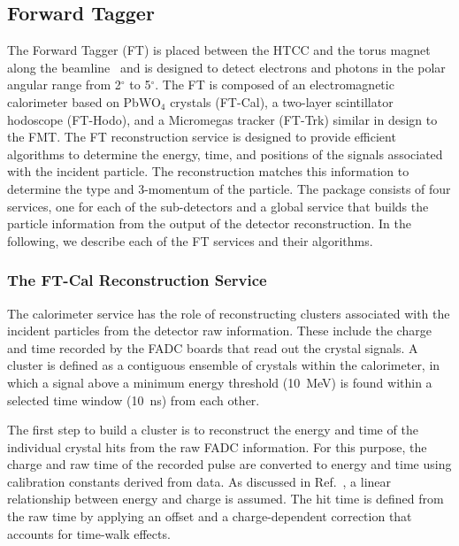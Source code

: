 \subsection{Forward Tagger}

The Forward Tagger (FT) is placed between the HTCC and the torus magnet along the beamline~\cite{ft-nim}
and is designed to detect electrons and photons in the polar angular range from 2$^\circ$ to 5$^\circ$. The
FT is composed of an electromagnetic calorimeter based on PbWO$_4$ crystals (FT-Cal), a two-layer scintillator
hodoscope (FT-Hodo), and a Micromegas tracker (FT-Trk) similar in design to the FMT. The FT reconstruction
service is designed to provide efficient algorithms to determine the energy, time, and positions of the signals
associated with the incident particle. The reconstruction matches this information to determine the type and
3-momentum of the particle. The package consists of four services, one for each of the sub-detectors and a global
service that builds the particle information from the output of the detector reconstruction. In the following, we
describe each of the FT services and their algorithms.

\subsubsection{The FT-Cal Reconstruction Service}

The calorimeter service has the role of reconstructing clusters associated with the incident particles from the
detector raw information. These include the charge and time recorded by the FADC boards that read out the
crystal signals. A cluster is defined as a contiguous ensemble of crystals within the calorimeter, in which a signal
above a minimum energy threshold (10~MeV) is found within a selected time window (10~ns) from each other.

The first step to build a cluster is to reconstruct the energy and time of the individual crystal hits from the raw
FADC information. For this purpose, the charge and raw time of the recorded pulse are converted to energy and
time using calibration constants derived from data. As discussed in Ref.~\cite{ft-nim}, a linear relationship between
energy and charge is assumed. The hit time is defined from the raw time by applying an offset and a charge-dependent
correction that accounts for time-walk effects.

